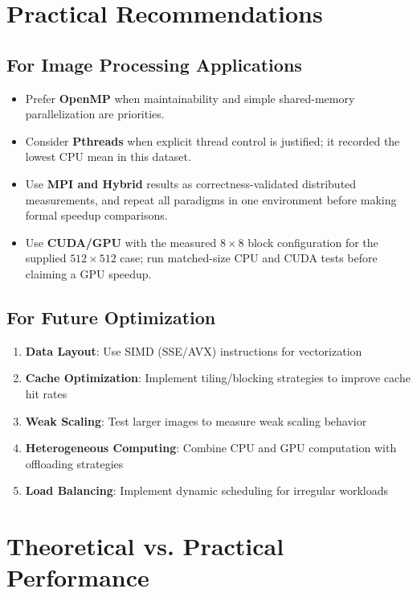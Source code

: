 \documentclass[12pt,a4paper]{report}
\begin{document}
\section{Practical Recommendations}

\subsection{For Image Processing Applications}
\begin{itemize}
    \item Prefer \textbf{OpenMP} when maintainability and simple shared-memory parallelization are priorities.
    \item Consider \textbf{Pthreads} when explicit thread control is justified; it recorded the lowest CPU mean in this dataset.
    \item Use \textbf{MPI and Hybrid} results as correctness-validated distributed measurements, and repeat all paradigms in one environment before making formal speedup comparisons.
    \item Use \textbf{CUDA/GPU} with the measured $8 \times 8$ block configuration for the supplied $512 \times 512$ case; run matched-size CPU and CUDA tests before claiming a GPU speedup.
\end{itemize}

\subsection{For Future Optimization}
\begin{enumerate}
    \item \textbf{Data Layout}: Use SIMD (SSE/AVX) instructions for vectorization
    \item \textbf{Cache Optimization}: Implement tiling/blocking strategies to improve cache hit rates
    \item \textbf{Weak Scaling}: Test larger images to measure weak scaling behavior
    \item \textbf{Heterogeneous Computing}: Combine CPU and GPU computation with offloading strategies
    \item \textbf{Load Balancing}: Implement dynamic scheduling for irregular workloads
\end{enumerate}

\section{Theoretical vs. Practical Performance}
\end{document}
